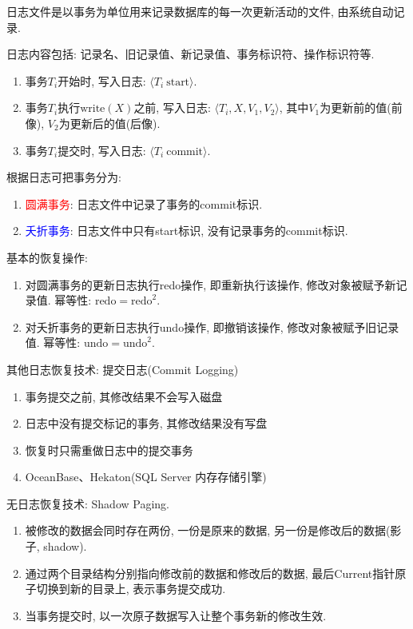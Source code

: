 \begin{definition}[日志]
日志文件是以事务为单位用来记录数据库的每一次更新活动的文件, 由系统自动记录.

日志内容包括: 记录名、旧记录值、新记录值、事务标识符、操作标识符等.
\begin{enumerate}
    \item 事务$T_i$开始时, 写入日志: $\langle T_i\ \text{start} \rangle$.
    \item 事务$T_i$执行$\text{write}(X)$之前, 写入日志: $\langle T_i, X, V_1, V_2 \rangle$, 其中$V_1$为更新前的值(前像), $V_2$为更新后的值(后像).
    \item 事务$T_i$提交时, 写入日志: $\langle T_i\ \text{commit} \rangle$.
\end{enumerate}
\end{definition}

根据日志可把事务分为:
\begin{enumerate}
    \item \textcolor{red}{圆满事务}: 日志文件中记录了事务的commit标识.
    \item \textcolor{blue}{夭折事务}: 日志文件中只有start标识, 没有记录事务的commit标识.
\end{enumerate}

基本的恢复操作:
\begin{enumerate}
    \item 对圆满事务的更新日志执行redo操作, 即重新执行该操作, 修改对象被赋予新记录值. 幂等性: $\text{redo}=\text{redo}^2$.
    \item 对夭折事务的更新日志执行undo操作, 即撤销该操作, 修改对象被赋予旧记录值. 幂等性: $\text{undo}=\text{undo}^2$.
\end{enumerate}

其他日志恢复技术: 提交日志(Commit Logging)
\begin{enumerate}
    \item 事务提交之前, 其修改结果不会写入磁盘
    \item 日志中没有提交标记的事务, 其修改结果没有写盘
    \item 恢复时只需重做日志中的提交事务
    \item OceanBase、Hekaton(SQL Server 内存存储引擎)
\end{enumerate}

无日志恢复技术: Shadow Paging.
\begin{enumerate}
    \item 被修改的数据会同时存在两份, 一份是原来的数据, 另一份是修改后的数据(影子, shadow).
    \item 通过两个目录结构分别指向修改前的数据和修改后的数据, 最后Current指针原子切换到新的目录上, 表示事务提交成功.
    \item 当事务提交时, 以一次原子数据写入让整个事务新的修改生效.
\end{enumerate}

